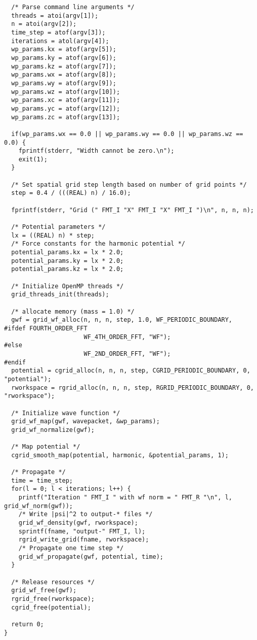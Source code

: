 \documentclass[12pt,letterpaper]{report}
\begin{document}
\begin{verbatim}
  /* Parse command line arguments */
  threads = atoi(argv[1]);
  n = atoi(argv[2]);
  time_step = atof(argv[3]);
  iterations = atol(argv[4]);
  wp_params.kx = atof(argv[5]);
  wp_params.ky = atof(argv[6]);
  wp_params.kz = atof(argv[7]);
  wp_params.wx = atof(argv[8]);
  wp_params.wy = atof(argv[9]);
  wp_params.wz = atof(argv[10]);
  wp_params.xc = atof(argv[11]);
  wp_params.yc = atof(argv[12]);
  wp_params.zc = atof(argv[13]);

  if(wp_params.wx == 0.0 || wp_params.wy == 0.0 || wp_params.wz == 0.0) {
    fprintf(stderr, "Width cannot be zero.\n");
    exit(1);
  }
  
  /* Set spatial grid step length based on number of grid points */
  step = 0.4 / (((REAL) n) / 16.0);
  
  fprintf(stderr, "Grid (" FMT_I "X" FMT_I "X" FMT_I ")\n", n, n, n);
  
  /* Potential parameters */
  lx = ((REAL) n) * step;
  /* Force constants for the harmonic potential */
  potential_params.kx = lx * 2.0;
  potential_params.ky = lx * 2.0;
  potential_params.kz = lx * 2.0;
  
  /* Initialize OpenMP threads */
  grid_threads_init(threads);
  
  /* allocate memory (mass = 1.0) */
  gwf = grid_wf_alloc(n, n, n, step, 1.0, WF_PERIODIC_BOUNDARY, 
#ifdef FOURTH_ORDER_FFT
                      WF_4TH_ORDER_FFT, "WF");
#else
                      WF_2ND_ORDER_FFT, "WF");
#endif
  potential = cgrid_alloc(n, n, n, step, CGRID_PERIODIC_BOUNDARY, 0, "potential");
  rworkspace = rgrid_alloc(n, n, n, step, RGRID_PERIODIC_BOUNDARY, 0, "rworkspace");
  
  /* Initialize wave function */
  grid_wf_map(gwf, wavepacket, &wp_params);
  grid_wf_normalize(gwf);
  
  /* Map potential */
  cgrid_smooth_map(potential, harmonic, &potential_params, 1);
  
  /* Propagate */
  time = time_step;
  for(l = 0; l < iterations; l++) {
    printf("Iteration " FMT_I " with wf norm = " FMT_R "\n", l, grid_wf_norm(gwf));
    /* Write |psi|^2 to output-* files */
    grid_wf_density(gwf, rworkspace);
    sprintf(fname, "output-" FMT_I, l);
    rgrid_write_grid(fname, rworkspace);
    /* Propagate one time step */
    grid_wf_propagate(gwf, potential, time);
  }

  /* Release resources */
  grid_wf_free(gwf);
  rgrid_free(rworkspace);
  cgrid_free(potential);
  
  return 0;
}


\end{verbatim}
\end{document}
